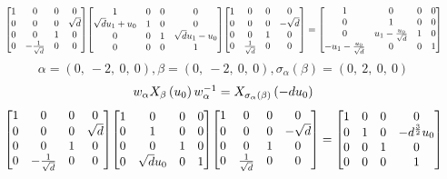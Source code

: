 \documentclass[11pt]{article}
\theoremstyle{definition}
\begin{document}
\[
\scaletoalign{\textwidth}{{\left[\begin{matrix}1 & 0 & 0 & 0\\0 & 0 & 0 & \sqrt{d}\\0 & 0 & 1 & 0\\0 & - \frac{1}{\sqrt{d}} & 0 & 0\end{matrix}\right]} {\left[\begin{matrix}1 & 0 & 0 & 0\\\sqrt{d} u_{1} + u_{0} & 1 & 0 & 0\\0 & 0 & 1 & \sqrt{d} u_{1} - u_{0}\\0 & 0 & 0 & 1\end{matrix}\right]} {\left[\begin{matrix}1 & 0 & 0 & 0\\0 & 0 & 0 & - \sqrt{d}\\0 & 0 & 1 & 0\\0 & \frac{1}{\sqrt{d}} & 0 & 0\end{matrix}\right]} = {\left[\begin{matrix}1 & 0 & 0 & 0\\0 & 1 & 0 & 0\\0 & u_{1} - \frac{u_{0}}{\sqrt{d}} & 1 & 0\\- u_{1} - \frac{u_{0}}{\sqrt{d}} & 0 & 0 & 1\end{matrix}\right]}}
\]
\[
\alpha = \left( 0, \  -2, \  0, \  0\right), \beta = \left( 0, \  -2, \  0, \  0\right), \sigma_{\alpha}(\beta) = \left( 0, \  2, \  0, \  0\right)
\]
\[
\scaletoalign{\textwidth}{w_{\alpha} X_{\beta}\left(u_{0}\right) w_{\alpha}^{-1} = X_{\sigma_{\alpha}\left(\beta\right)}\left(- d u_{0}\right)}
\]
\[
\scaletoalign{\textwidth}{{\left[\begin{matrix}1 & 0 & 0 & 0\\0 & 0 & 0 & \sqrt{d}\\0 & 0 & 1 & 0\\0 & - \frac{1}{\sqrt{d}} & 0 & 0\end{matrix}\right]} {\left[\begin{matrix}1 & 0 & 0 & 0\\0 & 1 & 0 & 0\\0 & 0 & 1 & 0\\0 & \sqrt{d} u_{0} & 0 & 1\end{matrix}\right]} {\left[\begin{matrix}1 & 0 & 0 & 0\\0 & 0 & 0 & - \sqrt{d}\\0 & 0 & 1 & 0\\0 & \frac{1}{\sqrt{d}} & 0 & 0\end{matrix}\right]} = {\left[\begin{matrix}1 & 0 & 0 & 0\\0 & 1 & 0 & - d^{\frac{3}{2}} u_{0}\\0 & 0 & 1 & 0\\0 & 0 & 0 & 1\end{matrix}\right]}}
\]
\end{document}
